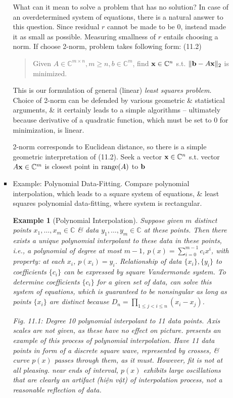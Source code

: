 \documentclass{article}
\newtheorem{example}{Example}
\begin{document}
\begin{itemize}
\begin{itemize}
\begin{itemize}
			What can it mean to solve a problem that has no solution? In case of an overdetermined system of equations, there is a natural answer to this question. Since residual $r$ cannot be made to be 0, instead made it as small as possible. Measuring smallness of $r$ entails choosing a norm. If choose 2-norm, problem takes following form: (11.2)
			\begin{quote}
				Given $A\in\mathbb{C}^{m\times n},m\ge n,b\in\mathbb{C}^m$, find ${\bf x}\in\mathbb{C}^n$ s.t. $\|{\bf b} - A{\bf x}\|_2$ is minimized.
			\end{quote}
			This is our formulation of general (linear) {\it least squares problem}. Choice of 2-norm can be defended by various geometric \& statistical arguments, \& it certainly leads to a simple algorithms -- ultimately because derivative of a quadratic function, which must be set to 0 for minimization, is linear.
			
			2-norm corresponds to Euclidean distance, so there is a simple geometric interpretation of (11.2). Seek a vector ${\bf x}\in\mathbb{C}^n$ s.t. vector $A{\bf x}\in\mathbb{C}^m$ is closest point in ${\rm range}(A)$ to ${\bf b}$
			\item {\sf Example: Polynomial Data-Fitting.} Compare polynomial interpolation, which leads to a square system of equations, \& least squares polynomial data-fitting, where system is rectangular.
			
			\begin{example}[Polynomial Interpolation]
				Suppose given $m$ distinct points $x_1,\ldots,x_m\in\mathbb{C}$ \& data $y_1,\ldots,y_m\in\mathbb{C}$ at these points. Then there exists a unique \emph{polynomial interpolant} to these data in these points, i.e., a polynomial of degree at most $m - 1$, $p(x) = \sum_{i=0}^{m-1} c_ix^i$, with property: at each $x_i$, $p(x_i) = y_i$. Relationship of data $\{x_i\},\{y_i\}$ to coefficients $\{c_i\}$ can be expressed by square Vandermonde system. To determine coefficients $\{c_i\}$ for a given set of data, can solve this system of equations, which is guaranteed to be nonsingular as long as points $\{x_i\}$ are distinct because $D_n = \prod_{1\le j < i\le n} (x_i - x_j)$.
				
				{\sf Fig. 11.1: Degree 10 polynomial interpolant to 11 data points. Axis scales are not given, as these have no effect on picture.} presents an example of this process of polynomial interpolation. Have 11 data points in form of a discrete square wave, represented by crosses, \& curve $p(x)$ passes through them, as it must. However, fit is not at all pleasing. near ends of interval, $p(x)$ exhibits large oscillations that are clearly an artifact (hiện vật) of interpolation process, not a reasonable reflection of data.
				

\end{example}
\end{itemize}
\end{itemize}
\end{itemize}
\end{document}
